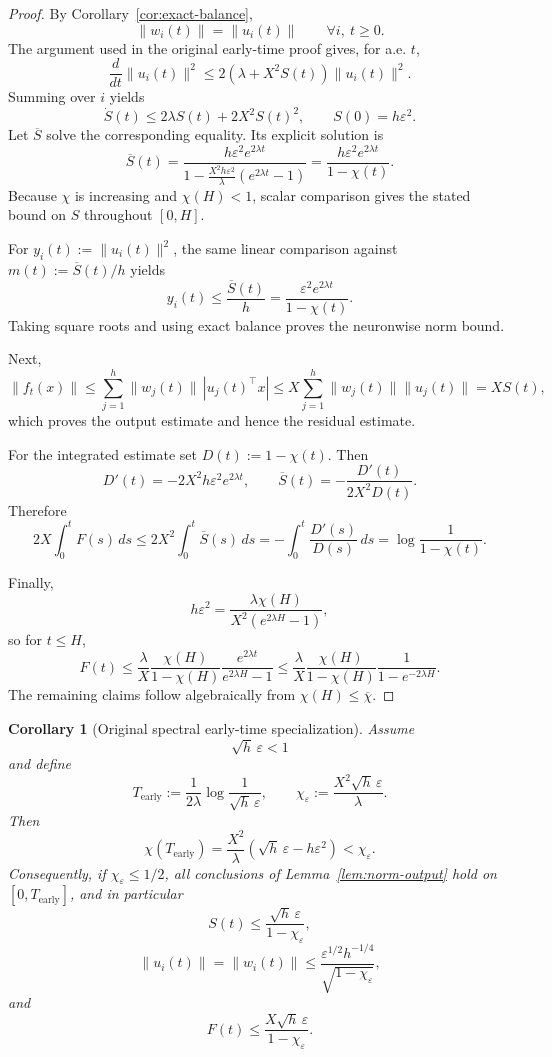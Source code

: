 \documentclass{article} %
\theoremstyle{plain}
\newtheorem{corollary}[theorem]{Corollary}
\theoremstyle{definition}
\theoremstyle{remark}
\begin{document}
\begin{proof}
By Corollary~\ref{cor:exact-balance},
\[
\|w_i(t)\|=\|u_i(t)\|
\qquad
\forall i,\ t\ge0.
\]
The argument used in the original early-time proof gives, for a.e. $t$,
\[
\frac{d}{dt}\|u_i(t)\|^2
\le
2\left(\lambda+X^2S(t)\right)\|u_i(t)\|^2.
\]
Summing over $i$ yields
\[
\boxed{
\dot S(t)
\le
2\lambda S(t)+2X^2S(t)^2,
\qquad
S(0)=h\varepsilon^2.
}
\]
Let $\overline S$ solve the corresponding equality.  Its explicit solution is
\[
\overline S(t)
=
\frac{h\varepsilon^2e^{2\lambda t}}
{1-\frac{X^2h\varepsilon^2}{\lambda}(e^{2\lambda t}-1)}
=
\frac{h\varepsilon^2e^{2\lambda t}}{1-\chi(t)}.
\]
Because $\chi$ is increasing and $\chi(H)<1$, scalar comparison gives the
stated bound on $S$ throughout $[0,H]$.

For $y_i(t):=\|u_i(t)\|^2$, the same linear comparison against
$m(t):=\overline S(t)/h$ yields
\[
y_i(t)
\le
\frac{\overline S(t)}h
=
\frac{\varepsilon^2e^{2\lambda t}}{1-\chi(t)}.
\]
Taking square roots and using exact balance proves the neuronwise norm bound.

Next,
\[
\|f_t(x)\|
\le
\sum_{j=1}^h\|w_j(t)\|\,|u_j(t)^\top x|
\le
X\sum_{j=1}^h\|w_j(t)\|\|u_j(t)\|
=
XS(t),
\]
which proves the output estimate and hence the residual estimate.

For the integrated estimate set $D(t):=1-\chi(t)$.  Then
\[
D'(t)=-2X^2h\varepsilon^2e^{2\lambda t},
\qquad
\overline S(t)=-\frac{D'(t)}{2X^2D(t)}.
\]
Therefore
\[
2X\int_0^tF(s)\,ds
\le
2X^2\int_0^t\overline S(s)\,ds
=
-\int_0^t\frac{D'(s)}{D(s)}\,ds
=
\log\frac1{1-\chi(t)}.
\]

Finally,
\[
h\varepsilon^2
=
\frac{\lambda\chi(H)}{X^2(e^{2\lambda H}-1)},
\]
so for $t\le H$,
\[
F(t)
\le
\frac{\lambda}{X}
\frac{\chi(H)}{1-\chi(H)}
\frac{e^{2\lambda t}}{e^{2\lambda H}-1}
\le
\frac{\lambda}{X}
\frac{\chi(H)}{1-\chi(H)}
\frac1{1-e^{-2\lambda H}}.
\]
The remaining claims follow algebraically from $\chi(H)\le\overline\chi$.
\end{proof}

\begin{corollary}[Original spectral early-time specialization]
\label{cor:norm-output-early}
Assume
\[
\sqrt h\,\varepsilon<1
\]
and define
\[
T_{\mathrm{early}}
:=
\frac1{2\lambda}\log\frac1{\sqrt h\,\varepsilon},
\qquad
\chi_\varepsilon
:=
\frac{X^2\sqrt h\,\varepsilon}{\lambda}.
\]
Then
\[
\chi(T_{\mathrm{early}})
=
\frac{X^2}{\lambda}
\left(\sqrt h\,\varepsilon-h\varepsilon^2\right)
<
\chi_\varepsilon.
\]
Consequently, if $\chi_\varepsilon\le1/2$, all conclusions of
Lemma~\ref{lem:norm-output} hold on $[0,T_{\mathrm{early}}]$, and in
particular
\[
S(t)
\le
\frac{\sqrt h\,\varepsilon}{1-\chi_\varepsilon},
\]
\[
\|u_i(t)\|
=
\|w_i(t)\|
\le
\frac{\varepsilon^{1/2}h^{-1/4}}{\sqrt{1-\chi_\varepsilon}},
\]
and
\[
F(t)
\le
\frac{X\sqrt h\,\varepsilon}{1-\chi_\varepsilon}.
\]
\end{corollary}
\end{document}
